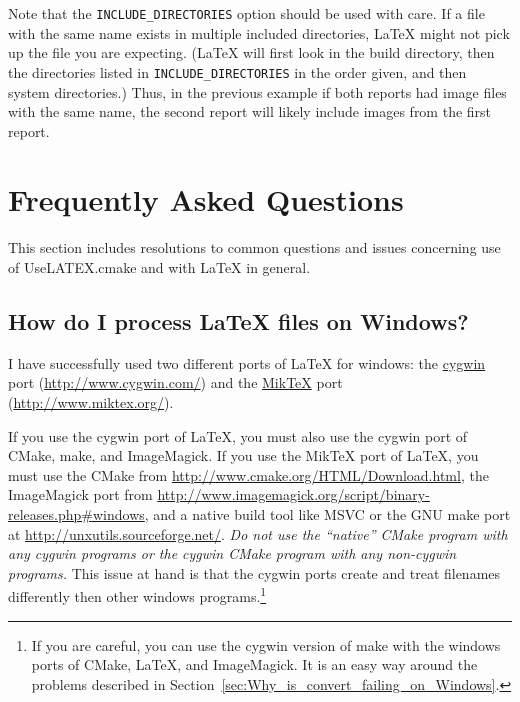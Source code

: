 \documentclass{article}
\newcommand*{\textfile}[1]{\textsf{#1}}
\newcommand*{\textcmake}[1]{\texttt{#1}}
\newcommand*{\UseLATEX}{\textfile{UseLATEX.cmake}\xspace}
\newcommand*{\latex}{\LaTeX\xspace}
\newcommand*{\miktex}{Mik\TeX\xspace}
\begin{document}
  Note that the \textcmake{INCLUDE\_DIRECTORIES} option should be used with care.
  If a file with the same name exists in multiple included directories, \latex might not pick up the file you are expecting.
  (\latex will first look in the build directory, then the directories listed in \textcmake{INCLUDE\_DIRECTORIES} in the order given, and then system directories.)
  Thus, in the previous example if both reports had image files with the same name, the second report will likely include images from the first report.


  \section{Frequently Asked Questions}
  \label{sec:FrequentlyAskedQuestions}

  This section includes resolutions to common questions and issues
  concerning use of \UseLATEX and with \latex in general.

  \subsection{How do I process \latex files on Windows?}
  \label{sec:How_do_I_process_latex_files_on_Windows}

  I have successfully used two different ports of LaTeX for windows: the
  \href{http://www.cygwin.com/}{cygwin} port
  (\href{http://www.cygwin.com/}{http://www.cygwin.com/}) and the
  \href{http://www.miktex.org/}{\miktex} port
  (\href{http://www.miktex.org/}{http://www.miktex.org/}).

  If you use the cygwin port of \latex, you must also use the cygwin port
  of CMake, make, and ImageMagick. If you use the \miktex port of \latex,
  you must use the CMake from
  \href{http://www.cmake.org/HTML/Download.html}{http://www.cmake.org/HTML/Download.html},
  the ImageMagick port from
  \href{http://www.imagemagick.org/script/binary-releases.php#windows}{http://www.imagemagick.org/script/binary-releases.php\#windows},
  and a native build tool like MSVC or the GNU make port at
  \href{http://unxutils.sourceforge.net/}{http://unxutils.sourceforge.net/}.
  \emph{Do not use the ``native'' CMake program with any cygwin programs or
  the cygwin CMake program with any non-cygwin programs.} This issue at
  hand is that the cygwin ports create and treat filenames differently then
  other windows programs.\footnote{If you are careful, you can use the
  cygwin version of make with the windows ports of CMake, \latex, and
  ImageMagick.  It is an easy way around the problems described in
  Section~\ref{sec:Why_is_convert_failing_on_Windows}.}
\end{document}
